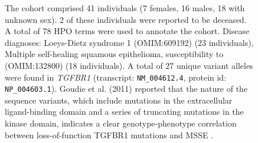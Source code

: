 \begin{figure}[htbp]
\vspace{2em}

\caption{ The cohort comprised 41 individuals (7 females, 16 males, 18 with unknown sex). 2 of these individuals were reported to be deceased. 
A total of 78 HPO terms were used to annotate the cohort. Disease diagnoses: Loeys-Dietz syndrome 1 (OMIM:609192) (23 individuals), Multiple self-healing squamous epithelioma, susceptibility to (OMIM:132800) 
(18 individuals). A total of 27 unique variant alleles were found in \textit{TGFBR1} (transcript: \texttt{NM\_004612.4}, protein id: \texttt{NP\_004603.1}).
Goudie et al. (2011) reported that the nature of the sequence variants, which include mutations in the extracellular ligand-binding domain and a series of truncating mutations in the kinase domain, 
indicates a clear genotype-phenotype correlation between loss-of-function TGFBR1 mutations and MSSE \cite{PMID_21358634}.
}
\end{figure}
